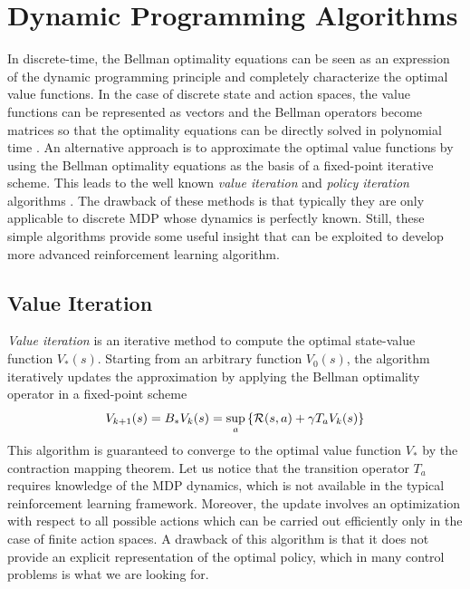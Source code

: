 \section{Dynamic Programming Algorithms}
\label{sec:policy_evaluation}
In discrete-time, the Bellman optimality equations can be seen as an expression of the dynamic programming principle and completely characterize the optimal value functions. In the case of discrete state and action spaces, the value functions can be represented as vectors and the Bellman operators become matrices so that the optimality equations can be directly solved in polynomial time \cite{littman1996algorithms}. An alternative approach is to approximate the optimal value functions by using the Bellman optimality equations as the basis of a fixed-point iterative scheme. This leads to the well known \emph{value iteration} and \emph{policy iteration} algorithms \cite{szepesvari2010algorithms}. The drawback of these methods is that typically they are only applicable to discrete MDP whose dynamics is perfectly known. Still, these simple algorithms provide some useful insight that can be exploited to develop more advanced reinforcement learning algorithm.

\subsection{Value Iteration}
\emph{Value iteration} is an iterative method to compute the optimal state-value function $V_*(s)$. Starting from an arbitrary function $V_0(s)$, the algorithm iteratively updates the approximation by applying the Bellman optimality operator in a fixed-point scheme
\begin{equation*}
	V_{k+1}(s) = B_* V_k(s) = \sup_a \left\{\mathcal{R}(s,a) + \gamma T_a V_k(s)\right\}
\end{equation*}
This algorithm is guaranteed to converge to the optimal value function $V_*$ by the contraction mapping theorem. Let us notice that the transition operator $T_a$ requires knowledge of the MDP dynamics, which is not available in the typical reinforcement learning framework. Moreover, the update involves an optimization with respect to all possible actions which can be carried out efficiently only in the case of finite action spaces. A drawback of this algorithm is that it does not provide an explicit representation of the optimal policy, which in many control problems is what we are looking for.  

